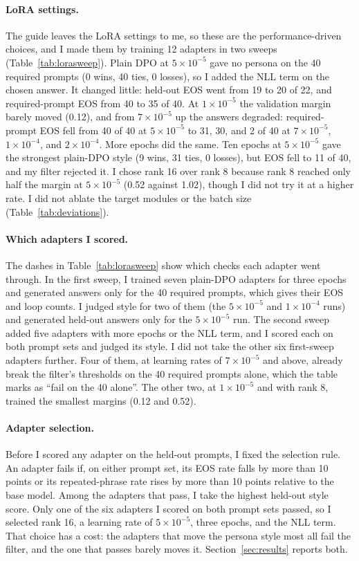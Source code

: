 \paragraph{LoRA settings.} The guide leaves the LoRA settings to me, so these are the performance-driven choices, and I made them by training 12 adapters in two sweeps (Table~\ref{tab:lorasweep}). Plain DPO at $5\times10^{-5}$ gave no persona on the 40 required prompts (0 wins, 40 ties, 0 losses), so I added the NLL term on the chosen answer. It changed little: held-out EOS went from 19 to 20 of 22, and required-prompt EOS from 40 to 35 of 40. At $1\times10^{-5}$ the validation margin barely moved (0.12), and from $7\times10^{-5}$ up the answers degraded: required-prompt EOS fell from 40 of 40 at $5\times10^{-5}$ to 31, 30, and 2 of 40 at $7\times10^{-5}$, $1\times10^{-4}$, and $2\times10^{-4}$. More epochs did the same. Ten epochs at $5\times10^{-5}$ gave the strongest plain-DPO style (9 wins, 31 ties, 0 losses), but EOS fell to 11 of 40, and my filter rejected it. I chose rank 16 over rank 8 because rank 8 reached only half the margin at $5\times10^{-5}$ (0.52 against 1.02), though I did not try it at a higher rate. I did not ablate the target modules or the batch size (Table~\ref{tab:deviations}).

\paragraph{Which adapters I scored.} The dashes in Table~\ref{tab:lorasweep} show which checks each adapter went through. In the first sweep, I trained seven plain-DPO adapters for three epochs and generated answers only for the 40 required prompts, which gives their EOS and loop counts. I judged style for two of them (the $5\times10^{-5}$ and $1\times10^{-4}$ runs) and generated held-out answers only for the $5\times10^{-5}$ run. The second sweep added five adapters with more epochs or the NLL term, and I scored each on both prompt sets and judged its style. I did not take the other six first-sweep adapters further. Four of them, at learning rates of $7\times10^{-5}$ and above, already break the filter's thresholds on the 40 required prompts alone, which the table marks as ``fail on the 40 alone''. The other two, at $1\times10^{-5}$ and with rank 8, trained the smallest margins (0.12 and 0.52).

\paragraph{Adapter selection.} Before I scored any adapter on the held-out prompts, I fixed the selection rule. An adapter fails if, on either prompt set, its EOS rate falls by more than 10 points or its repeated-phrase rate rises by more than 10 points relative to the base model. Among the adapters that pass, I take the highest held-out style score. Only one of the six adapters I scored on both prompt sets passed, so I selected rank 16, a learning rate of $5\times10^{-5}$, three epochs, and the NLL term. That choice has a cost: the adapters that move the persona style most all fail the filter, and the one that passes barely moves it. Section~\ref{sec:results} reports both.

